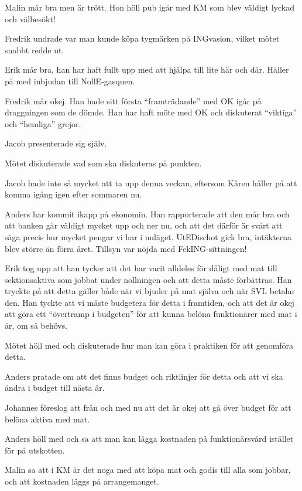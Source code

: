 \documentclass[10pt]{article}
\begin{document}
\begin{paragrafer}
\begin{paragrafer}
Malin mår bra men är trött. Hon höll pub igår med KM som blev väldigt lyckad och välbesökt!

Fredrik undrade var man kunde köpa tygmärken på INGvasion, vilket mötet snabbt redde ut.

Erik mår bra, han har haft fullt upp med att hjälpa till lite här och där. Håller på med inbjudan till NollE-gasquen.

Fredrik mår okej. Han hade sitt första ``framträdande'' med OK igår på draggningen som de dömde. Han har haft möte med OK och diskuterat ``viktiga'' och ``hemliga'' grejor.

Jacob presenterade sig själv.

Mötet diskuterade vad som ska diskuteras på punkten.

Jacob hade inte så mycket att ta upp denna veckan, eftersom Kåren håller på att komma igång igen efter sommaren nu.

Anders har kommit ikapp på ekonomin. Han rapporterade att den mår bra och att banken går väldigt mycket upp och ner nu, och att det därför är svårt att säga precis hur mycket pengar vi har i nuläget. UtEDischot gick bra, intäkterna blev större än förra året. Tillsyn var nöjda med FekING-sittningen!

\end{paragrafer}


Erik tog upp att han tycker att det har varit alldeles för dåligt med mat till sektionsaktiva som jobbat under nollningen och att detta måste förbättras. Han tryckte på att detta gäller både när vi bjuder på mat själva och när SVL betalar den. Han tyckte att vi måste budgetera för detta i framtiden, och att det är okej att göra ett ``övertramp i budgeten'' för att kunna belöna funktionärer med mat i år, om så behövs.

Mötet höll med och diskuterade hur man kan göra i praktiken för att genomföra detta.

Anders pratade om att det finns budget och riktlinjer för detta och att vi ska ändra i budget till nästa år.

Johannes föreslog att från och med nu att det är okej att gå över budget för att belöna aktiva med mat.

Anders höll med och sa att man kan lägga kostnaden på funktionärsvård istället för på utskotten.

Malin sa att i KM är det noga med att köpa mat och godis till alla som jobbar, och att kostnaden läggs på arrangemanget.


\end{paragrafer}
\end{document}
